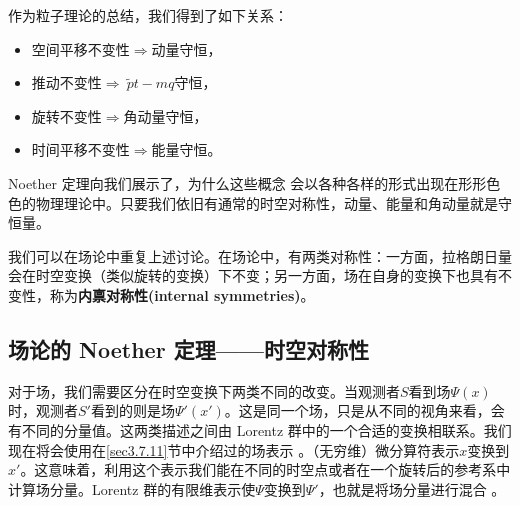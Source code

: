 作为粒子理论的总结，我们得到了如下关系：
\begin{itemize}
\item 空间平移不变性$\Rightarrow$动量守恒，
\item 推动不变性$\Rightarrow~\tilde{p}t-mq$守恒，
\item 旋转不变性$\Rightarrow$角动量守恒，
\item 时间平移不变性$\Rightarrow$能量守恒。
\end{itemize}
Noether 定理向我们展示了，为什么这些概念%
%
会以各种各样的形式出现在形形色色的物理理论中。只要我们依旧有通常的时空对称性，动量、能量和角动量就是守恒量。

我们可以在场论中重复上述讨论。在场论中，有两类对称性：一方面，拉格朗日量会在时空变换（类似旋转的变换）下不变；另一方面，场在自身的变换下也具有不变性，称为{\bfseries 内禀对称性(internal symmetries)}。

\subsection{场论的 Noether 定理——时空对称性}\label{sec4.5.2}
对于场，我们需要区分在时空变换下两类不同的改变。当观测者$S$看到场$\Psi(x)$时，观测者$S'$看到的则是场$\Psi'(x')$。这是同一个场，只是从不同的视角来看，会有不同的分量值。这两类描述之间由 Lorentz 群中的一个合适的变换相联系。我们现在将会使用在\ref{sec3.7.11}节中介绍过的场表示%
。（无穷维）微分算符表示$x$变换到$x'$。这意味着，利用这个表示我们能在不同的时空点或者在一个旋转后的参考系中计算场分量。Lorentz 群的有限维表示使$\Psi$变换到$\Psi'$，也就是将场分量进行混合%
。

